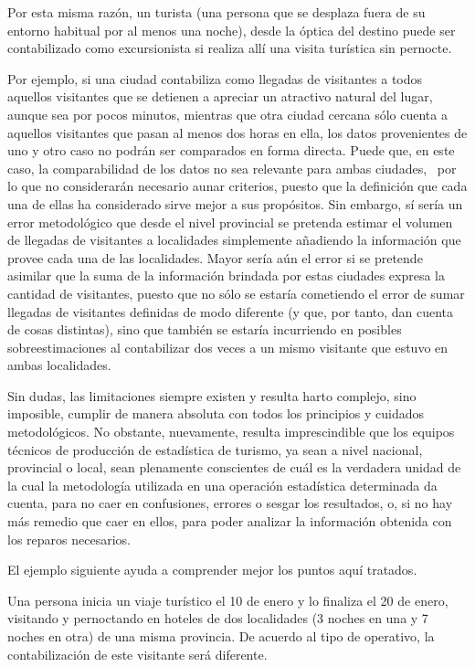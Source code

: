 \documentclass[
]{book}
\begin{document}
Por esta misma razón, un turista (una persona que se desplaza fuera de su entorno habitual por al menos una noche), desde la óptica del destino puede ser contabilizado como excursionista si realiza allí una visita turística sin pernocte.

Por ejemplo, si una ciudad contabiliza como llegadas de visitantes a todos aquellos visitantes que se detienen a apreciar un atractivo natural del lugar, aunque sea por pocos minutos, mientras que otra ciudad cercana sólo cuenta a aquellos visitantes que pasan al menos dos horas en ella, los datos provenientes de uno y otro caso no podrán ser comparados en forma directa. Puede que, en este caso, la comparabilidad de los datos no sea relevante para ambas ciudades,~ por lo que no considerarán necesario aunar criterios, puesto que la definición que cada una de ellas ha considerado sirve mejor a sus propósitos. Sin embargo, sí sería un error metodológico que desde el nivel provincial se pretenda estimar el volumen de llegadas de visitantes a localidades simplemente añadiendo la información que provee cada una de las localidades. Mayor sería aún el error si se pretende asimilar que la suma de la información brindada por estas ciudades expresa la cantidad de visitantes, puesto que no sólo se estaría cometiendo el error de sumar llegadas de visitantes definidas de modo diferente (y que, por tanto, dan cuenta de cosas distintas), sino que también se estaría incurriendo en posibles sobreestimaciones al contabilizar dos veces a un mismo visitante que estuvo en ambas localidades.

Sin dudas, las limitaciones siempre existen y resulta harto complejo, sino imposible, cumplir de manera absoluta con todos los principios y cuidados metodológicos. No obstante, nuevamente, resulta imprescindible que los equipos técnicos de producción de estadística de turismo, ya sean a nivel nacional, provincial o local, sean plenamente conscientes de cuál es la verdadera unidad de la cual la metodología utilizada en una operación estadística determinada da cuenta, para no caer en confusiones, errores o sesgar los resultados, o, si no hay más remedio que caer en ellos, para poder analizar la información obtenida con los reparos necesarios.

El ejemplo siguiente ayuda a comprender mejor los puntos aquí tratados.

Una persona inicia un viaje turístico el 10 de enero y lo finaliza el 20 de enero, visitando y pernoctando en hoteles de dos localidades (3 noches en una y 7 noches en otra) de una misma provincia. De acuerdo al tipo de operativo, la contabilización de este visitante será diferente.
\end{document}
